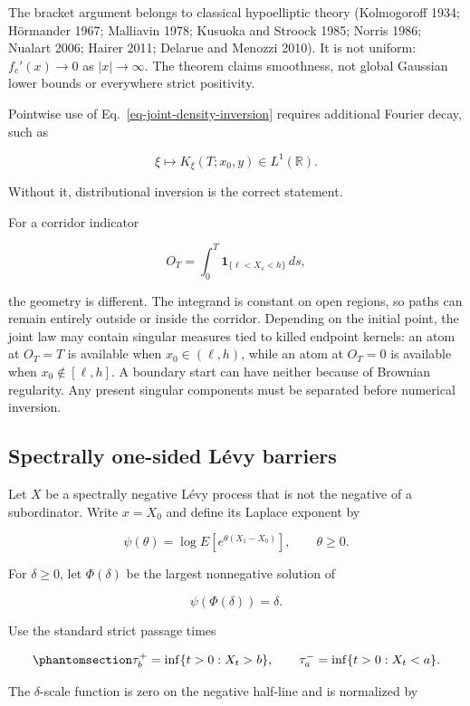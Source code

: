 \documentclass[
  english,
  11pt,
  letterpaper,
  DIV=11,
  numbers=noendperiod]{scrartcl}
\theoremstyle{plain}
\theoremstyle{plain}
\theoremstyle{plain}
\theoremstyle{plain}
\theoremstyle{remark}
\begin{document}
The bracket argument belongs to classical hypoelliptic theory
(Kolmogoroff 1934; Hörmander 1967; Malliavin 1978; Kusuoka and Stroock
1985; Norris 1986; Nualart 2006; Hairer 2011; Delarue and Menozzi 2010).
It is not uniform: \(f_c'(x)\to0\) as \(|x|\to\infty\). The theorem
claims smoothness, not global Gaussian lower bounds or everywhere strict
positivity.

Pointwise use of Eq.~\ref{eq-joint-density-inversion} requires
additional Fourier decay, such as

\[
\xi\mapsto K_\xi(T;x_0,y)\in L^1(\mathbb R).
\]

Without it, distributional inversion is the correct statement.

For a corridor indicator

\[
O_T=\int_0^T\mathbf1_{\{\ell<X_s<h\}}\,ds,
\]

the geometry is different. The integrand is constant on open regions, so
paths can remain entirely outside or inside the corridor. Depending on
the initial point, the joint law may contain singular measures tied to
killed endpoint kernels: an atom at \(O_T=T\) is available when
\(x_0\in(\ell,h)\), while an atom at \(O_T=0\) is available when
\(x_0\notin[\ell,h]\). A boundary start can have neither because of
Brownian regularity. Any present singular components must be separated
before numerical inversion.

\subsection{Spectrally one-sided Lévy barriers}\label{sec-levy}

Let \(X\) be a spectrally negative Lévy process that is not the negative
of a subordinator. Write \(x=X_0\) and define its Laplace exponent by

\[
\psi(\theta)
=\log E[e^{\theta(X_1-X_0)}],
\qquad \theta\ge0.
\]

For \(\delta\ge0\), let \(\Phi(\delta)\) be the largest nonnegative
solution of

\[
\psi(\Phi(\delta))=\delta.
\]

Use the standard strict passage times

\begin{equation}\protect\phantomsection\label{eq-levy-passage-times}{
\tau_b^+
=\inf\{t>0:X_t>b\},
\qquad
\tau_a^-
=\inf\{t>0:X_t<a\}.
}\end{equation}

The \(\delta\)-scale function is zero on the negative half-line and is
normalized by
\end{document}

